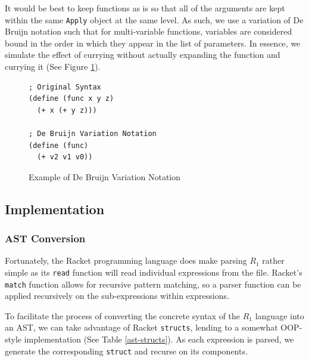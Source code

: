 \documentclass[12pt]{article}
\newcommand{\R}{\ensuremath{\mathit{R_{1}}}}
\newcommand{\key}[1]{\texttt{#1}}
\begin{document}
It would be best to keep functions as is so that all of the arguments are kept within the same \key{Apply} object at the same level. As such, we use a variation of De Bruijn notation such that for multi-variable functions, variables are considered bound in the order in which they appear in the list of parameters. In essence, we simulate the effect of currying without actually expanding the function and currying it (See Figure \ref{debruijn-variation}).

\begin{figure}[H]
  \begin{mdframed}
    \begin{verbatim}
; Original Syntax
(define (func x y z)
  (+ x (+ y z)))

; De Bruijn Variation Notation
(define (func)
  (+ v2 v1 v0))
    \end{verbatim}
  \end{mdframed}
  \caption{Example of De Bruijn Variation Notation}
  \label{debruijn-variation}
\end{figure}

\subsection{Implementation}
\subsubsection{AST Conversion}
Fortunately, the Racket programming language does make parsing \R{} rather simple as its \key{read} function will read individual expressions from the file. Racket's \key{match} function allows for recursive pattern matching, so a parser function can be applied recursively on the sub-expressions within expressions.

\hfill

To facilitate the process of converting the concrete syntax of the \R{} language into an AST, we can take advantage of Racket \key{structs}, lending to a somewhat OOP-style implementation (See Table \ref{ast-structs}). As each expression is parsed, we generate the corresponding \key{struct} and recurse on its components.
\end{document}
